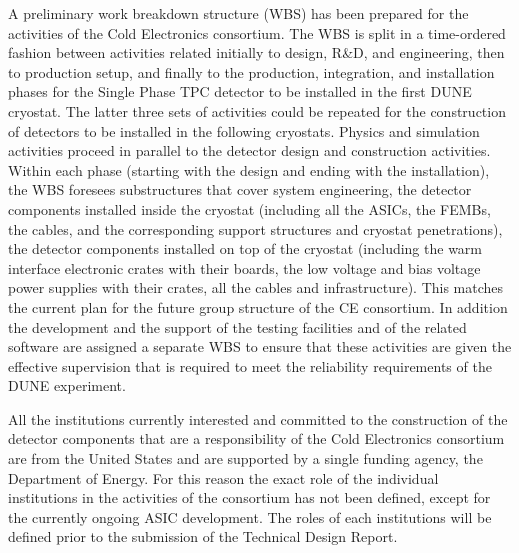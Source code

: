 A preliminary work breakdown structure (WBS) has been prepared for the activities
of the Cold Electronics consortium. The WBS is split in a time-ordered fashion
between activities related initially to design, R\&D, and engineering, then
to production setup, and finally to the production, integration, and installation
phases for the Single Phase TPC detector to be installed in the first DUNE cryostat.
The latter three sets of activities could be repeated for the construction
of detectors to be installed in the following cryostats. Physics and simulation
activities proceed in parallel to the detector design and construction activities.
Within each phase (starting with the design and ending with the installation),
the WBS foresees substructures that cover system engineering, the detector
components installed inside the cryostat (including all the ASICs, the FEMBs,
the cables, and the corresponding support structures and cryostat penetrations),
the detector components installed on top of the cryostat (including the warm
interface electronic crates with their boards, the low voltage and bias
voltage power supplies with their crates, all the cables and infrastructure). This
matches the current plan for the future group structure of the CE consortium. In
addition the development and the support of the testing facilities and of
the related software are assigned a separate WBS to ensure that these activities
are given the effective supervision that is required to meet the reliability
requirements of the DUNE experiment.

All the institutions currently interested and committed to the construction of
the detector components that are a responsibility of the Cold Electronics
consortium are from the United States and are supported by a single
funding agency, the Department of Energy. For this reason the exact role of
the individual institutions in the activities of the consortium has not been
defined, except for the currently ongoing ASIC development. The roles of
each institutions will be defined prior to the submission of the Technical
Design Report.
